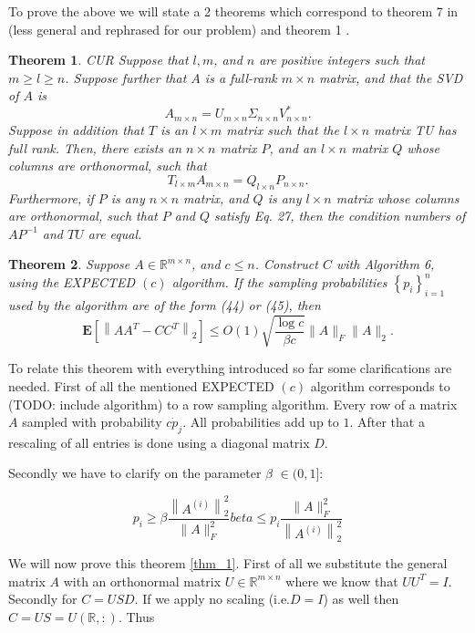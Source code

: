 \documentclass{article}
\newtheorem{theorem}{Theorem}
\begin{document}
To prove the above we will state a 2 theorems which correspond to theorem 7 in
\cite{randalg} (less general and rephrased for our problem) and theorem 1
\cite{CUR}.

\begin{theorem}{CUR} \label{thm_2}
Suppose that $l, m$, and $n$ are positive integers such that $m \geq l \geq n$.
Suppose further that $A$ is a full-rank $m \times n$ matrix, and that the SVD
of $A$ is
$$
A_{m \times n}=U_{m \times n} \Sigma_{n \times n} V_{n \times n}^{*} .
$$
Suppose in addition that $T$ is an $l \times m$ matrix such that the $l \times
n$ matrix TU has full rank.
Then, there exists an $n \times n$ matrix $P$, and an $l \times n$ matrix $Q$
whose columns are orthonormal, such that
$$
T_{l \times m} A_{m \times n}=Q_{l \times n} P_{n \times n} .
$$
Furthermore, if $P$ is any $n \times n$ matrix, and $Q$ is any $l \times n$
matrix whose columns are orthonormal, such that $P$ and $Q$ satisfy Eq. 27,
then the condition numbers of $A P^{-1}$ and $T U$ are equal.
\end{theorem}

\begin{theorem} \label{thm_3}
Suppose $A \in \mathbb{R}^{m \times n}$, and $c
\leq n$. Construct $C$ with Algorithm 6, using the EXPECTED $(c)$
algorithm. If the sampling probabilities $\left\{p_{i}\right\}_{i=1}^{n}$ used
by the algorithm are of the form (44) or (45), then
$$
\mathbf{E}\left[\left\|A A^{T}-C C^{T}\right\|_{2}\right] \leq O(1) \sqrt{\frac{\log c}{\beta c}}\|A\|_{F}\|A\|_{2} .
$$
\end{theorem}

To relate this theorem with everything introduced so far some clarifications
are needed. First of all the mentioned EXPECTED $(c)$ algorithm corresponds to
(TODO: include algorithm) to a row sampling algorithm. Every row of a matrix
$A$ sampled with probability $c \dot p_j$. All probabilities add up to $1$.
After that a rescaling of all entries is done using a diagonal matrix $D$.

Secondly we have to clarify on the parameter $\beta$ $\in (0,1]$:

\begin{equation} \label{eq_beta}
p_i \geq \beta \frac{\left\|A^{(i)}\right\|^2_2}{\|A\|_{F}^2}
beta \leq p_i \frac{\|A\|_{F}^2}{\left\|A^{(i)}\right\|^2_2}
\end{equation}

We will now prove this theorem \ref{thm_1}. First of all we substitute the
general matrix $A$ with an orthonormal matrix $U \in  \mathbb{R}^{m \times n}$
where we know that $UU^T=I$. Secondly for $C=USD$. If we apply no scaling
(i.e.$D=I$) as well then $C=US=U(\mathbb{R},:)$. Thus
\end{document}
